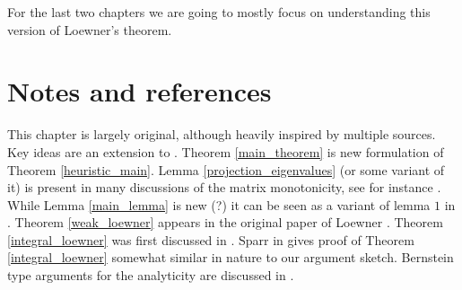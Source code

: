 For the last two chapters we are going to mostly focus on understanding this version of Loewner's theorem.

\section{Notes and references}

This chapter is largely original, although heavily inspired by multiple sources. Key ideas are an extension to \cite{Heina}. Theorem \ref{main_theorem} is new formulation of Theorem \ref{heuristic_main}. Lemma \ref{projection_eigenvalues} (or some variant of it) is present in many discussions of the matrix monotonicity, see for instance \cite{Don}. While Lemma \ref{main_lemma} is new (?) it can be seen as a variant of lemma $1$ in \cite{Sparr}. Theorem \ref{weak_loewner} appears in the original paper of Loewner \cite{Low}. Theorem \ref{integral_loewner} was first discussed in \cite{Ben}. Sparr in \cite{Sparr} gives proof of Theorem \ref{integral_loewner} somewhat similar in nature to our argument sketch. Bernstein type arguments for the analyticity are discussed in \cite{Ben}.
